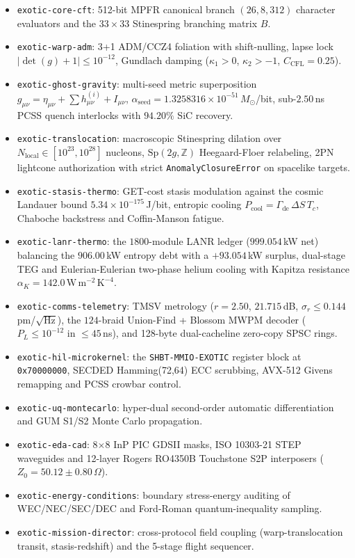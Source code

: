\documentclass[aps,pra,10pt,onecolumn,superscriptaddress,nofootinbib,longbibliography,floatfix]{revtex4-2}
\newcommand{\ExoticLanrModules}{1800}%
\newcommand{\ExoticLanrNetKw}{999.054}%
\newcommand{\ExoticLanrDebtKw}{906.00}%
\newcommand{\ExoticLanrSurplusKw}{+93.054}%
\newcommand{\ExoticTmsvR}{2.50}%
\newcommand{\ExoticTmsvDb}{21.715}%
\newcommand{\ExoticTmsvSigmaR}{0.144}%
\newcommand{\ExoticLandauerBound}{5.34\times 10^{-175}}%
\newcommand{\ExoticBraidDescriptors}{124}%
\newcommand{\ExoticTqecLatencyNs}{45}%
\newcommand{\ExoticInterposerZ}{50.12 \pm 0.80}%
\begin{document}
\begin{itemize}
  \item \texttt{exotic-core-cft}: 512-bit MPFR canonical branch $(26,8,312)$ character evaluators and the $33\times33$ Stinespring branching matrix $B$.
  \item \texttt{exotic-warp-adm}: 3+1 ADM/CCZ4 foliation with shift-nulling, lapse lock $|\det(g)+1|\le10^{-12}$, Gundlach damping ($\kappa_1>0$, $\kappa_2>-1$, $C_{\mathrm{CFL}}=0.25$).
  \item \texttt{exotic-ghost-gravity}: multi-seed metric superposition $g_{\mu\nu}=\eta_{\mu\nu}+\sum h_{\mu\nu}^{(i)}+I_{\mu\nu}$, $\alpha_{\mathrm{seed}}=1.3258316\times10^{-51}\,M_\odot$/bit, sub-$2.50$\,ns PCSS quench interlocks with $94.20\%$ SiC recovery.
  \item \texttt{exotic-translocation}: macroscopic Stinespring dilation over $N_{\mathrm{local}}\in[10^{23},10^{28}]$ nucleons, $\mathrm{Sp}(2g,\mathbb{Z})$ Heegaard-Floer relabeling, 2PN lightcone authorization with strict \texttt{AnomalyClosureError} on spacelike targets.
  \item \texttt{exotic-stasis-thermo}: GET-cost stasis modulation against the cosmic Landauer bound $\ExoticLandauerBound$\,J/bit, entropic cooling $P_{\mathrm{cool}}=\Gamma_{\mathrm{de}}\,\Delta S\,T_c$, Chaboche backstress and Coffin-Manson fatigue.
  \item \texttt{exotic-lanr-thermo}: the $\ExoticLanrModules$-module LANR ledger ($\ExoticLanrNetKw$\,kW net) balancing the $\ExoticLanrDebtKw$\,kW entropy debt with a $\ExoticLanrSurplusKw$\,kW surplus, dual-stage TEG and Eulerian-Eulerian two-phase helium cooling with Kapitza resistance $\alpha_K=142.0\,\mathrm{W\,m^{-2}\,K^{-4}}$.
  \item \texttt{exotic-comms-telemetry}: TMSV metrology ($r=\ExoticTmsvR$, $\ExoticTmsvDb$\,dB, $\sigma_r\le\ExoticTmsvSigmaR$\,pm/$\sqrt{\mathrm{Hz}}$), the $\ExoticBraidDescriptors$-braid Union-Find + Blossom MWPM decoder ($P_L\le10^{-12}$ in $\le\ExoticTqecLatencyNs$\,ns), and 128-byte dual-cacheline zero-copy SPSC rings.
  \item \texttt{exotic-hil-microkernel}: the \texttt{SHBT-MMIO-EXOTIC} register block at \texttt{0x70000000}, SECDED Hamming(72,64) ECC scrubbing, AVX-512 Givens remapping and PCSS crowbar control.
  \item \texttt{exotic-uq-montecarlo}: hyper-dual second-order automatic differentiation and GUM S1/S2 Monte Carlo propagation.
  \item \texttt{exotic-eda-cad}: 8$\times$8 InP PIC GDSII masks, ISO 10303-21 STEP waveguides and 12-layer Rogers RO4350B Touchstone S2P interposers ($Z_0=\ExoticInterposerZ\,\Omega$).
  \item \texttt{exotic-energy-conditions}: boundary stress-energy auditing of WEC/NEC/SEC/DEC and Ford-Roman quantum-inequality sampling.
  \item \texttt{exotic-mission-director}: cross-protocol field coupling (warp-translocation transit, stasis-redshift) and the 5-stage flight sequencer.
\end{itemize}
\end{document}
